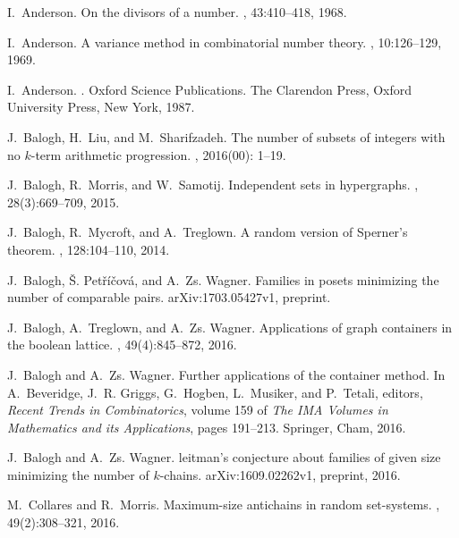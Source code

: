 \documentclass[11 pt]{article}
\theoremstyle{definition}
\theoremstyle{case}
\numberwithin{equation}{section}
\begin{document}
  \begin{thebibliography}{10}

I.~Anderson.
\newblock On the divisors of a number.
, 43:410--418, 1968.

I.~Anderson.
\newblock A variance method in combinatorial number theory.
, 10:126--129, 1969.

I.~Anderson.
.
\newblock Oxford Science Publications. The Clarendon Press, Oxford University
  Press, New York, 1987.

J.~Balogh, H.~Liu, and M.~Sharifzadeh.
\newblock The number of subsets of integers with no $k$-term arithmetic
  progression.
, 2016(00): 1--19.  

J.~Balogh, R.~Morris, and W.~Samotij.
\newblock Independent sets in hypergraphs.
, 28(3):669--709, 2015.

J.~Balogh, R.~Mycroft, and A.~Treglown.
\newblock A random version of {S}perner's theorem.
, 128:104--110, 2014.

J.~Balogh, \v{S}. Pet\v{r}\'{i}\v{c}ov\'{a}, and A.~Zs. Wagner.
\newblock Families in posets minimizing the number of comparable pairs.
\newblock arXiv:1703.05427v1, preprint.

J.~Balogh, A.~Treglown, and A.~Zs. Wagner.
\newblock Applications of graph containers in the boolean lattice.
, 49(4):845--872, 2016.

J.~Balogh and A.~Zs. Wagner.
\newblock Further applications of the container method.
\newblock In A.~Beveridge, J.~R. Griggs, G.~Hogben, L.~Musiker, and P.~Tetali,
  editors, {\em Recent Trends in Combinatorics}, volume 159 of {\em The IMA
  Volumes in Mathematics and its Applications}, pages 191--213. Springer, Cham,
  2016.

J.~Balogh and A.~Zs. Wagner.
leitman's conjecture about families of given size minimizing the
  number of $k$-chains.
\newblock arXiv:1609.02262v1, preprint, 2016.

M.~Collares and R.~Morris.
\newblock Maximum-size antichains in random set-systems.
, 49(2):308--321, 2016.


\end{thebibliography}
\end{document}
